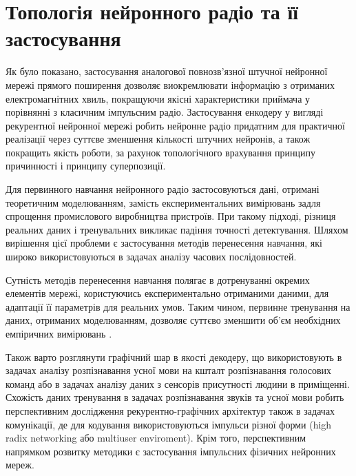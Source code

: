 
\section{Топологія нейронного радіо та її застосування}

Як було показано, застосування аналогової повнозв'язної штучної нейронної 
мережі прямого поширення дозволяє виокремлювати інформацію з отриманих 
електромагнітних хвиль, покращуючи якісні характеристики приймача у 
порівнянні з класичним імпульсним радіо. Застосування енкодеру у вигляді 
рекурентної нейронної мережі робить нейронне радіо придатним для практичної 
реалізації через суттєве зменшення кількості штучних нейронів, а також 
покращить якість роботи, за рахунок топологічного врахування принципу 
причинності і принципу суперпозиції.

Для первинного навчання нейронного радіо застосовуються дані, отримані 
теоретичним моделюванням, замість експериментальних вимірювань задля спрощення 
промислового виробництва пристроїв. При такому підході,
різниця реальних даних і тренувальних викликає падіння точності детектування.
Шляхом вирішення цієї проблеми є застосування методів перенесення навчання, які 
широко використовуються в задачах аналізу часових послідовностей. 

Сутність методів перенесення навчання полягає в дотренуванні окремих елементів 
мережі, користуючись експериментально отриманими даними, для адаптації її 
параметрів для реальних умов. Таким чином, первинне тренування на даних,
отриманих моделюванням, дозволяє суттєво зменшити об'єм необхідних 
емпіричних вимірювань \cite{imp:Bozinovski2020}.

Також варто розглянути графічний шар в якості декодеру, що використовують в
задачах аналізу розпізнавання усної мови на кшталт розпізнавання голосових 
команд або в задачах аналізу даних з сенсорів
присутності людини в приміщенні. Схожість даних
тренування в задачах розпізнавання звуків та усної мови робить перспективним
дослідження рекурентно-графічних архітектур також в задачах комунікації, де 
для кодування використовуються імпульси різної форми (high radix networking
або multiuser enviroment).
Крім того, перспективним напрямком розвитку методики є застосування 
імпульсних фізичних нейронних мереж.

